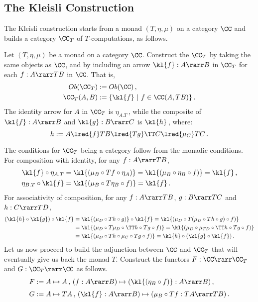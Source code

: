 \documentclass[12pt]{article}
\begin{document}
\subsection{The Kleisli Construction}
%
The Kleisli construction starts from a monad $(T,\eta,\mu)$ on a category $\CC$ and builds a category $\CC_T$ of $T$-computations, as follows.
\begin{mydefinition}
Let $(T,\eta,\mu)$ be a monad on a category $\CC$. Construct the  $\CC_T$ by taking the same objects as $\CC$, and by
including an arrow $\kl{f}:A\rarr B$ in $\CC_T$ for each $f:A\rarr TB$ in $\CC$. That is,
\begin{align*}
  Ob(\CC_T) &:= Ob(\CC)\,, \\
  \CC_T(A,B) &:= \{ \kl{f}\ |\ f\in\CC(A,TB)\}\,.
\end{align*}
The identity arrow for $A$ in $\CC_T$ is $\eta_{A.T}$\,, while the composite of $\kl{f}:A\rarr B$ and $\kl{g}:B\rarr C$ is $\kl{h}$\,, where:
\[ h := A\lred{f}TB\lred{Tg}\TT C\lred{\mu_C}TC\,. \]
\deq[-1]
\end{mydefinition}
%
The conditions for $\CC_T$ being a category follow from the monadic conditions. For composition with identity, for any $f:A\rarr TB$,
%
\begin{align*}
    \kl{f}\circ\eta_{A.T} &= \kl{(\mu_B\circ Tf\circ\eta_A)} = \kl{(\mu_B\circ\eta_B\circ f)}=\kl{f}\,,  \\
    \eta_{B.T}\circ\kl{f} &= \kl{(\mu_B\circ T\eta_B\circ f)} = \kl{f}\,.
\end{align*}
%
For associativity of composition, for any $f:A\rarr TB$, $g:B\rarr TC$ and $h:C\rarr TD$,
\begin{align*}
  (\kl{h}\circ\kl{g})\circ\kl{f} &= \kl{(\mu_D\circ Th\circ g)}\circ\kl{f} = \kl{(\mu_D\circ T(\mu_D\circ Th\circ g)\circ f)} \\
    &= \kl{(\mu_D\circ T\mu_D\circ \TT h\circ Tg\circ f)} = \kl{(\mu_D\circ \mu_{TD}\circ \TT h\circ Tg\circ f)}\\
    &= \kl{(\mu_D\circ Th\circ\mu_C\circ Tg\circ f)} = \kl{h}\circ(\kl{g}\circ\kl{f})\,.
\end{align*}
%
%
Let us now proceed to build the adjunction between $\CC$ and $\CC_T$ that will eventually give us back the monad $T$. Construct the functors
$F:\CC\rarr\CC_T$ and $G:\CC_T\rarr\CC$ as follows.
\begin{align*}
  F&:= A\mapsto A\,,\, (f:A\rarr B) \mapsto (\kl{(\eta_B\circ f)}:A\rarr B)\,, \\[1mm]
  G&:= A\mapsto TA\,,\, (\kl{f}:A\rarr B) \mapsto (\mu_B\circ Tf:TA\rarr TB)\,.
\end{align*}
\end{document}
